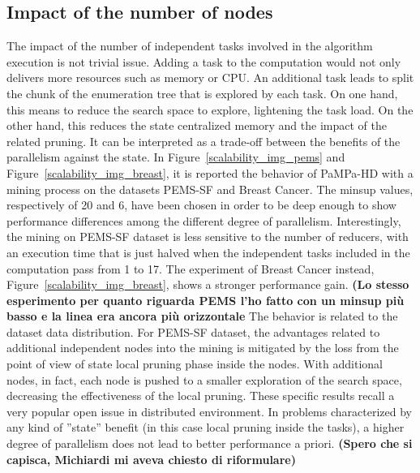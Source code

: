 \subsection{Impact of the number of nodes}\label{scalability}
The impact of the number of independent tasks involved in the algorithm execution is not trivial issue. Adding a task to the computation would not only delivers more resources such as memory or CPU. An additional task leads to split the chunk of the enumeration tree that is explored by each task. On one hand, this means to reduce the search space to explore, lightening the task load. On the other hand, this reduces the state centralized memory and the impact of the related pruning. It can be interpreted as a trade-off between the benefits of the parallelism against the state. 
In Figure~\ref{scalability_img_pems} and Figure~\ref{scalability_img_breast}, it is reported the behavior of PaMPa-HD with a mining process on the datasets PEMS-SF and Breast Cancer. The minsup values, respectively of 20 and 6, have been chosen in order to be deep enough to show performance differences among the different degree of parallelism.
Interestingly, the mining on PEMS-SF dataset is less sensitive to the number of reducers, with an execution time that is just halved when the independent tasks included in the computation pass from 1 to 17. The experiment of Breast Cancer instead, Figure~\ref{scalability_img_breast}, shows a stronger performance gain. 
\textbf{(Lo stesso esperimento per quanto riguarda PEMS l'ho fatto con un minsup più basso e la linea era ancora più orizzontale}
The behavior is related to the dataset data distribution. 
For PEMS-SF dataset, the advantages related to additional independent nodes into the mining is mitigated by the loss from the point of view of state local pruning phase inside the nodes. With additional nodes, in fact, each node is pushed to a smaller exploration of the search space, decreasing the effectiveness of the local pruning.
These specific results recall a very popular open issue in distributed environment. In problems characterized by any kind of ''state'' benefit (in this case local pruning inside the tasks), a higher degree of parallelism does not lead to better performance a priori. \textbf{(Spero che si capisca, Michiardi mi aveva chiesto di riformulare)}

